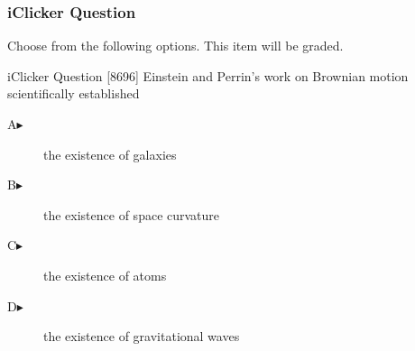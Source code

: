 \begin{frame}
  \frametitle{iClicker Question}
Choose from the following options. This item will be graded.
\begin{block}{iClicker Question}
[8696] Einstein and Perrin's work on Brownian motion scientifically
established 
\end{block}
\begin{description}
\item[A\hspace{.2in}$\blacktriangleright$] the existence of galaxies
\item[B\hspace{.2in}$\blacktriangleright$] the existence of space curvature
\item[C\hspace{.2in}$\blacktriangleright$] the existence of atoms
\item[D\hspace{.2in}$\blacktriangleright$] the existence of gravitational waves
\end{description}
\end{frame}
